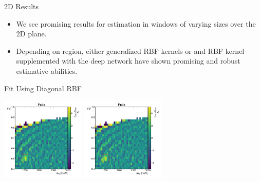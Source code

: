 \documentclass[10pt]{beamer}
\begin{document}
\begin{frame}{2D Results}
  \begin{itemize}
  \item We see promising results for estimation in windows of varying sizes over the 2D plane. 
  \item Depending on region, either generalized RBF kernels or and RBF kernel supplemented with the deep network have shown promising and robust estimative abilities.
  \end{itemize}
\end{frame}

\begin{frame}{Fit Using Diagonal RBF}
  \begin{center}
    \includegraphics[width=0.3\textwidth]{figures/2dpullplots/rbf/E_1500_0p5_100_0p05.pdf} 
    \includegraphics[width=0.3\textwidth]{figures/2dpullplots/rbf/E_1500_0p5_150_0p05.pdf}

\end{center}
\end{frame}
\end{document}
